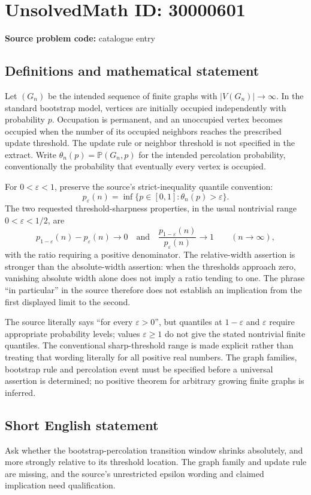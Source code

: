 \documentclass[11pt]{article}
\begin{document}
\section*{UnsolvedMath ID: 30000601}
\textbf{Source problem code:} catalogue entry
\subsection{Definitions and mathematical statement}
Let $(G_n)$ be the intended sequence of finite graphs with $|V(G_n)|\to\infty$. In the standard bootstrap model, vertices are initially occupied independently with probability $p$. Occupation is permanent, and an unoccupied vertex becomes occupied when the number of its occupied neighbors reaches the prescribed update threshold. The update rule or neighbor threshold is not specified in the extract. Write $\theta_n(p)=\mathbb P(G_n,p)$ for the intended percolation probability, conventionally the probability that eventually every vertex is occupied.

For $0<\varepsilon<1$, preserve the source's strict-inequality quantile convention:
\[
p_\varepsilon(n)=\inf\{p\in[0,1]:\theta_n(p)>\varepsilon\}.
\]
The two requested threshold-sharpness properties, in the usual nontrivial range $0<\varepsilon<1/2$, are
\[
p_{1-\varepsilon}(n)-p_\varepsilon(n)\longrightarrow0
\quad\text{and}\quad
\frac{p_{1-\varepsilon}(n)}{p_\varepsilon(n)}\longrightarrow1
\qquad(n\to\infty),
\]
with the ratio requiring a positive denominator. The relative-width assertion is stronger than the absolute-width assertion: when the thresholds approach zero, vanishing absolute width alone does not imply a ratio tending to one. The phrase ``in particular'' in the source therefore does not establish an implication from the first displayed limit to the second.

The source literally says ``for every $\varepsilon>0$'', but quantiles at $1-\varepsilon$ and $\varepsilon$ require appropriate probability levels; values $\varepsilon\geq1$ do not give the stated nontrivial finite quantiles. The conventional sharp-threshold range is made explicit rather than treating that wording literally for all positive real numbers. The graph families, bootstrap rule and percolation event must be specified before a universal assertion is determined; no positive theorem for arbitrary growing finite graphs is inferred.
\subsection{Short English statement}
Ask whether the bootstrap-percolation transition window shrinks absolutely, and more strongly relative to its threshold location. The graph family and update rule are missing, and the source's unrestricted epsilon wording and claimed implication need qualification.
\end{document}
